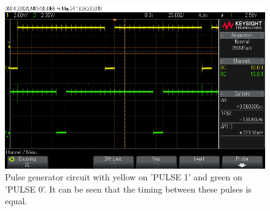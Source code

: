 \begin{figure}[H]
\centering
\includegraphics[width=.9\textwidth]{figures/scope_6.png}
\caption{Pulse generator circuit with yellow on 'PULSE 1' and green on 'PULSE 0'. It can be seen that the timing between these pulses is equal.}
\label{fig:scope_6}
\end{figure}

